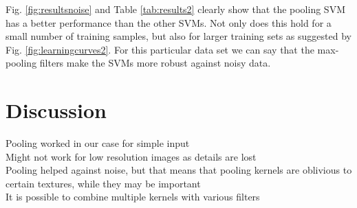 \documentclass[10pt,twocolumn,letterpaper]{article}
\begin{document}



\noindent
Fig. \ref{fig:resultsnoise} and Table \ref{tab:results2} clearly show that the pooling SVM has a better performance than the other SVMs. 
Not only does this hold for a small number of training samples, but also for larger training sets as suggested by Fig. \ref{fig:learningcurves2}.
For this particular data set we can say that the max-pooling filters make the SVMs more robust against noisy data.







\section{Discussion}

{\color{lightgray}

Pooling worked in our case for simple input\\

Might not work for low resolution images as details are lost\\

Pooling helped against noise, but that means that pooling kernels are oblivious to certain textures, while they may be important\\

It is possible to combine multiple kernels with various filters\\





}





{\small


}
\end{document}

